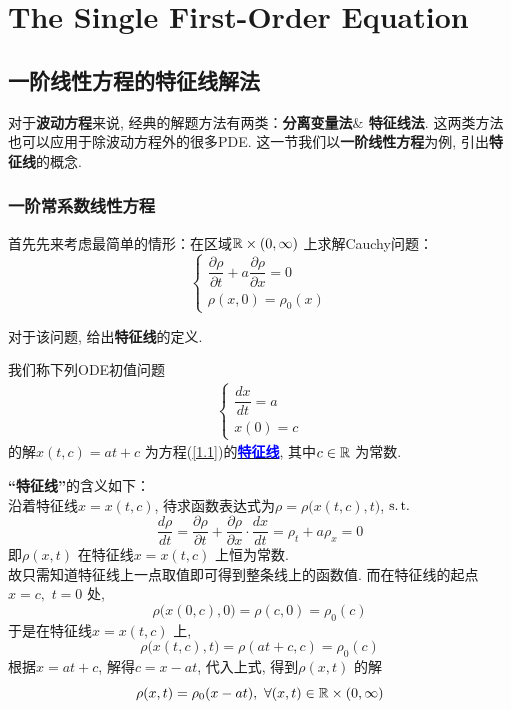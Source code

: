\ifx\allfiles\undefined


	\else
	\fi
\chapter{The Single First-Order Equation}

\section{一阶线性方程的特征线解法}
	对于\textbf{波动方程}来说, 经典的解题方法有两类：\textbf{分离变量法$\&$ 特征线法}. 这两类方法也可以应用于除波动方程外的很多PDE. 这一节我们以\textbf{一阶线性方程}为例, 引出\textbf{特征线}的概念. 
	
\subsection{一阶常系数线性方程}
	首先先来考虑最简单的情形：在区域$\mathbb{R} \times (0 , \infty)$ 上求解Cauchy问题：
	\begin{equation}
		\begin{cases}
			\dfrac{\partial \rho}{\partial t} + a \dfrac{\partial \rho}{\partial x} = 0 \\
			\rho(x , 0) = \rho_0(x)
		\end{cases}\label{1.1}
	\end{equation}
	
	\vspace*{1em}
	
	对于该问题, 给出\textbf{特征线}的定义. 
	\begin{defn}\label{def 1.1.1}
		我们称下列ODE初值问题
		\begin{align*}
			\begin{cases}
				\dfrac{dx}{dt} = a \\
				x(0) = c
			\end{cases}
		\end{align*}
		的解$x(t , c) = at + c$ 为方程(\ref{1.1})的\underline{\textcolor{blue}{\textbf{特征线}}}, 其中$c \in \mathbb{R}$ 为常数. 
			
		\vspace*{3em}
		
		\begin{rmk}
			\textbf{“特征线”}的含义如下：\\
			沿着特征线$x = x(t , c)$, 待求函数表达式为$\rho = \rho\Big( x(t , c) , t \Big)$, $\operatorname{s.t.}$
			\[ \frac{d\rho}{dt} = \frac{\partial \rho}{\partial t} + \frac{\partial \rho}{\partial x} \cdot \frac{dx}{dt} = \rho_t + a\rho_x = 0 \]
			即$\rho(x , t)$ 在特征线$x = x(t , c)$ 上恒为常数. \\
			故只需知道特征线上一点取值即可得到整条线上的函数值. 而在特征线的起点$x = c , \,\, t = 0$ 处, 
			\[ \rho\Big( x(0 , c) , 0 \Big) = \rho(c , 0) = \rho_0(c) \]
			于是在特征线$x = x(t , c)$ 上, 
			\[ \rho\Big( x(t , c) , t \Big) = \rho(at + c , c) = \rho_0(c) \]
			根据$x = at + c$, 解得$c = x - at$, 代入上式, 得到$\rho(x , t)$ 的解
			\[ \rho(x , t) = \rho_0(x - at) , \,\, \forall (x , t) \in \mathbb{R} \times (0 , \infty) \]
		\end{rmk}
	\end{defn}
	
